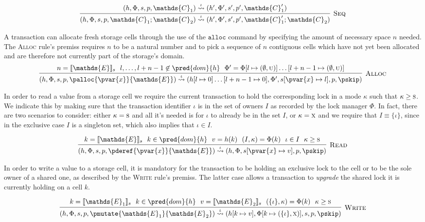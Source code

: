 \[
\infer[\textsc{Seq}]
{
	(h, \Phi, s, p, \mathds{C}_1 ; \mathds{C}_2)
	\overset{\iota}{\rightsquigarrow}
	(h', \Phi', s', p', \mathds{C}_1' ; \mathds{C}_2)
}
{
	(h, \Phi, s, p, \mathds{C}_1)
	\overset{\iota}{\rightsquigarrow}
	(h', \Phi', s', p', \mathds{C}_1')
}
\]

A transaction can allocate fresh storage cells through the use of the $\mathtt{alloc}$ command by specifying the amount of necessary space $n$ needed. The \textsc{Alloc} rule's premiss requires $n$ to be a natural number and to pick a sequence of $n$ contiguous cells which have not yet been allocated and are therefore not currently part of the storage's domain.
\[
\infer[\textsc{Alloc}]
{
	(h, \Phi, s, p, \palloc{\pvar{x}}{\mathds{E}})
	\overset{\iota}{\rightsquigarrow}
	(h[l \mapsto 0] \ldots [l + n - 1 \mapsto 0], \Phi', s[\pvar{x} \mapsto l], p, \pskip)
}
{
	n = \llbracket \mathds{E} \rrbracket_s\ \
	l, \ldots, l + n - 1 \not\in \pred{dom}{h}\ \
	\Phi' = \Phi[l \mapsto (\emptyset, \textsc{u})]\ldots[l + n - 1 \mapsto (\emptyset, \textsc{u})]
}
\]

In order to read a value from a storage cell we require the current transaction to hold the corresponding lock in a mode $\kappa$ such that $\kappa \geq \textsc{s}$. We indicate this by making sure that the transaction identifier $\iota$ is in the set of owners $I$ as recorded by the lock manager $\Phi$. In fact, there are two scenarios to consider: either $\kappa = \textsc{s}$ and all it's needed is for $\iota$ to already be in the set $I$, or $\kappa = \textsc{x}$ and we require that $I \equiv \{ \iota \}$, since in the exclusive case $I$ is a singleton set, which also implies that $\iota \in I$.

\[
\infer[\textsc{Read}]
{
	(h, \Phi, s, p, \pderef{\pvar{x}}{\mathds{E}})
	\overset{\iota}{\rightsquigarrow}
	(h, \Phi, s[\pvar{x} \mapsto v], p, \pskip)
}
{
	k = \llbracket \mathds{E} \rrbracket_s\ \
	k \in \pred{dom}{h}\ \
	v = h(k)\ \
	(I, \kappa) = \Phi(k)\ \
	\iota \in I\ \
	\kappa \geq \textsc{s}
}
\]

In order to write a value to a storage cell, it is mandatory for the transaction to be holding an exclusive lock to the cell or to be the sole owner of a shared one, as described by the \textsc{Write} rule's premiss. The latter case allows a transaction to \textit{upgrade} the shared lock it is currently holding on a cell $k$.

\[
\infer[\textsc{Write}]
{
	(h, \Phi, s, p, \pmutate{\mathds{E}_1}{\mathds{E}_2})
	\overset{\iota}{\rightsquigarrow}
	(h[k \mapsto v], \Phi[k \mapsto (\{\iota\}, \textsc{x})], s, p, \pskip)
}
{
	k = \llbracket \mathds{E}_1 \rrbracket_s\ \
	k \in \pred{dom}{h}\ \
	v = \llbracket \mathds{E}_2 \rrbracket_s\ \
	(\{ \iota \}, \kappa) = \Phi(k)\ \
	\kappa \geq \textsc{s}
}
\]

